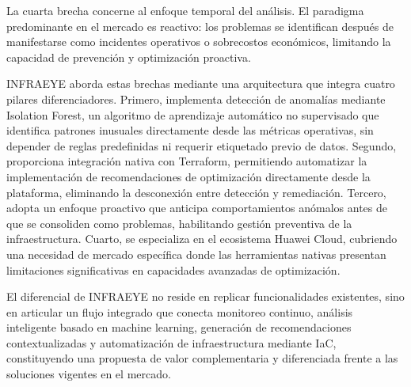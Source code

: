 La cuarta brecha concerne al enfoque temporal del análisis. El paradigma predominante en el mercado es reactivo: los problemas se identifican después de manifestarse como incidentes operativos o sobrecostos económicos, limitando la capacidad de prevención y optimización proactiva.

INFRAEYE aborda estas brechas mediante una arquitectura que integra cuatro pilares diferenciadores. Primero, implementa detección de anomalías mediante Isolation Forest, un algoritmo de aprendizaje automático no supervisado que identifica patrones inusuales directamente desde las métricas operativas, sin depender de reglas predefinidas ni requerir etiquetado previo de datos. Segundo, proporciona integración nativa con Terraform, permitiendo automatizar la implementación de recomendaciones de optimización directamente desde la plataforma, eliminando la desconexión entre detección y remediación. Tercero, adopta un enfoque proactivo que anticipa comportamientos anómalos antes de que se consoliden como problemas, habilitando gestión preventiva de la infraestructura. Cuarto, se especializa en el ecosistema Huawei Cloud, cubriendo una necesidad de mercado específica donde las herramientas nativas presentan limitaciones significativas en capacidades avanzadas de optimización.

El diferencial de INFRAEYE no reside en replicar funcionalidades existentes, sino en articular un flujo integrado que conecta monitoreo continuo, análisis inteligente basado en machine learning, generación de recomendaciones contextualizadas y automatización de infraestructura mediante IaC, constituyendo una propuesta de valor complementaria y diferenciada frente a las soluciones vigentes en el mercado.
